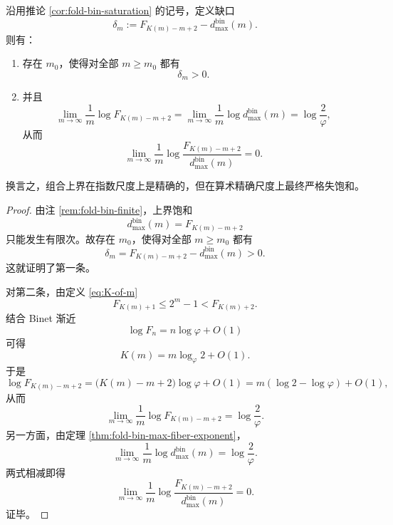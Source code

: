 \begin{theorem}\label{thm:xi-foldbin-maxfiber-upper-bound-exponential-sharp-nonsaturation}
沿用推论 \ref{cor:fold-bin-saturation} 的记号，定义缺口
\[
\delta_m:=F_{K(m)-m+2}-d_{\max}^{\mathrm{bin}}(m).
\]
则有：
\begin{enumerate}
  \item 存在 \(m_0\)，使得对全部 \(m\ge m_0\) 都有
  \[
  \delta_m>0.
  \]
  \item 并且
  \[
  \lim_{m\to\infty}\frac1m\log F_{K(m)-m+2}
  =
  \lim_{m\to\infty}\frac1m\log d_{\max}^{\mathrm{bin}}(m)
  =
  \log\frac{2}{\varphi},
  \]
  从而
  \[
  \lim_{m\to\infty}\frac1m\log\frac{F_{K(m)-m+2}}{d_{\max}^{\mathrm{bin}}(m)}=0.
  \]
\end{enumerate}
换言之，组合上界在指数尺度上是精确的，但在算术精确尺度上最终严格失饱和。
\end{theorem}
\begin{proof}
由注 \ref{rem:fold-bin-finite}，上界饱和
\[
d_{\max}^{\mathrm{bin}}(m)=F_{K(m)-m+2}
\]
只能发生有限次。故存在 \(m_0\)，使得对全部 \(m\ge m_0\) 都有
\[
\delta_m=F_{K(m)-m+2}-d_{\max}^{\mathrm{bin}}(m)>0.
\]
这就证明了第一条。

对第二条，由定义 \eqref{eq:K-of-m}
\[
F_{K(m)+1}\le 2^m-1<F_{K(m)+2}.
\]
结合 Binet 渐近
\[
\log F_n=n\log\varphi+O(1)
\]
可得
\[
K(m)=m\log_{\varphi}2+O(1).
\]
于是
\[
\log F_{K(m)-m+2}
=
\bigl(K(m)-m+2\bigr)\log\varphi+O(1)
=
m(\log2-\log\varphi)+O(1),
\]
从而
\[
\lim_{m\to\infty}\frac1m\log F_{K(m)-m+2}
=
\log\frac{2}{\varphi}.
\]
另一方面，由定理 \ref{thm:fold-bin-max-fiber-exponent}，
\[
\lim_{m\to\infty}\frac1m\log d_{\max}^{\mathrm{bin}}(m)
=
\log\frac{2}{\varphi}.
\]
两式相减即得
\[
\lim_{m\to\infty}\frac1m\log\frac{F_{K(m)-m+2}}{d_{\max}^{\mathrm{bin}}(m)}=0.
\]
证毕。
\end{proof}

\endinput
